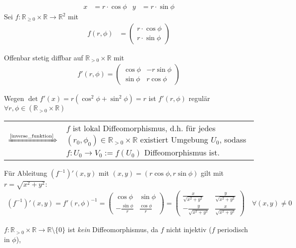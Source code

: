 \begin{example}
	{\zeroAmsmathAlignVSpaces*\begin{align*}
		x &= r\cdot \cos\phi & y &= r\cdot\sin\phi
	\end{align*}}
	Sei $f:\mathbb{R}_{\ge 0}\times\mathbb{R}\to\mathbb{R}^2$ mit \begin{align*}
		f(r,\phi) &= \begin{pmatrix}
			r\cdot\cos\phi \\ r\cdot\sin\phi
		\end{pmatrix}
	\end{align*}
	
	Offenbar stetig \gls{diffbar} auf $\mathbb{R}_{>0}\times\mathbb{R}$ mit \begin{align*}
		f'(r,\phi) = \begin{pmatrix}
			\cos\phi & -r\sin\phi \\ \sin\phi & r\cos\phi
		\end{pmatrix}
	\end{align*}
	
	Wegen $\det f'(x) = r(\cos^2\phi + \sin^2\phi) = r$ ist $f'(r,\phi)$ regulär $\forall r,\phi\in (\mathbb{R}_{>0}\times\mathbb{R})$ \\
	\begin{tabularx}{\linewidth}{r@{\ \ }X}
	$\xRightarrow{\text{\cref{inverse_funktion}}}$ & $f$ ist lokal Diffeomorphismus, d.h. für jedes $(r_0, \phi_0)\in\mathbb{R}_{>0}\times\mathbb{R}$ existiert Umgebung $U_0$, sodass $f:U_0\to V_0 :=f(U_0)$ Diffeomorphismus ist.
	\end{tabularx}
	
	Für Ableitung $(f^{-1})'(x,y)$ mit $(x,y) = (r\cos\phi, r\sin\phi)$ gilt mit $r = \sqrt{x^2 + y^2}$:\begin{align*}
		\left(f^{-1}\right)'(x,y) = f'(r,\phi)^{-1} = \begin{pmatrix}
			\cos\phi & \sin\phi \\ -\frac{\sin\phi}{r} & \frac{\cos\phi}{r}
			\end{pmatrix}
			 = \begin{pmatrix}
				\frac{x}{\sqrt{x^2+y^2}} & \frac{y}{\sqrt{x^2 + y^2}} \\
				-\frac{y}{\sqrt{x^2+y^2}} & \frac{x}{\sqrt{x^2+y^2}}
			\end{pmatrix}\quad\forall (x,y)\neq 0
	\end{align*}
	
	\begin{underlinedenvironment}[beachte]
		$f:\mathbb{R}_{>0}\times\mathbb{R}\to\mathbb{R}\setminus\{0\}$ ist \emph{kein} Diffeomorphismus, da $f$ nicht injektiv ($f$ periodisch in $\phi$),
		

\end{underlinedenvironment}
\end{example}
